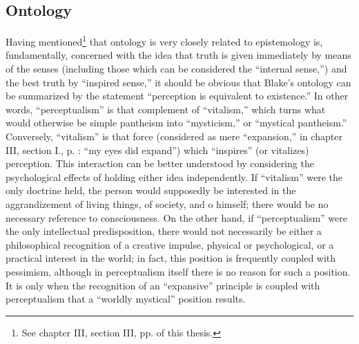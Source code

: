 \subsection{Ontology}

Having mentioned\footnote{See chapter III, section III, pp. \pageref{self:25} of this thesis.}
that ontology is very closely related to epistemology is, fundamentally, concerned with the idea that
truth is given immediately by means of the senses (including those which can be considered the \enquote{internal sense,}) and the best truth
by \enquote{inspired sense,} it should be obvious that Blake's ontology can be summarized by the statement \enquote{perception is
equivalent to existence.} In other words, \enquote{perceptualism} is that complement of \enquote{vitalism,} which turns what
would otherwise be simple pantheism into \enquote{mysticism,} or \enquote{mystical pantheism.} Conversely, \enquote{vitalism} is that force
(considered as mere \enquote{expansion,} in chapter III, section I., p. \pageref{self:26}: \enquote{my eyes did expand}) which \enquote{inspires} (or vitalizes) perception.
This interaction can be better understood by considering the psychological effects of holding either idea independently.
If \enquote{vitalism} were the only doctrine held, the person would supposedly be interested in the aggrandizement of living things, of
society, and o himself; there would be no necessary reference to consciousness. On the other hand, if \enquote{perceptualism} were the only intellectual predisposition, there would not necessarily be either a philosophical recognition of a creative impulse, physical
or psychological, or a practical interest in the world; in fact, this position is frequently coupled with pessimism, although in
perceptualism itself there is no reason for such a position. It is only when the recognition of an \enquote{expansive} principle is
coupled with perceptualism that a \enquote{worldly mystical} position results.

